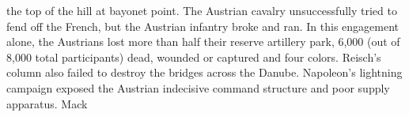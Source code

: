 the top of the hill at bayonet point. The Austrian cavalry unsuccessfully tried to fend off the French, but the Austrian infantry broke and ran. In this engagement alone, the Austrians lost more than half their reserve artillery park, 6,000 (out of 8,000 total participants) dead, wounded or captured and four colors. Reisch's column also failed to destroy the bridges across the Danube. 
Napoleon's lightning campaign exposed the Austrian indecisive command structure and poor supply apparatus. Mack 